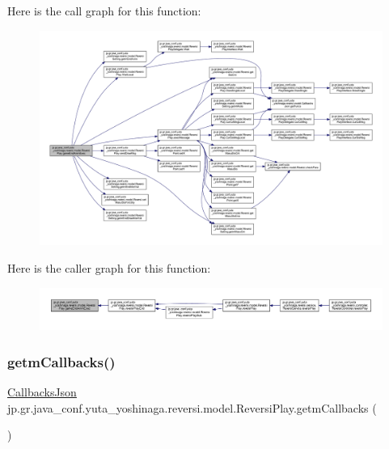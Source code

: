 Here is the call graph for this function\+:
\nopagebreak
\begin{figure}[H]
\begin{center}
\leavevmode
\includegraphics[width=350pt]{classjp_1_1gr_1_1java__conf_1_1yuta__yoshinaga_1_1reversi_1_1model_1_1_reversi_play_aaf0f07bdc219b6d8ec5551457fb551ab_cgraph}
\end{center}
\end{figure}
Here is the caller graph for this function\+:
\nopagebreak
\begin{figure}[H]
\begin{center}
\leavevmode
\includegraphics[width=350pt]{classjp_1_1gr_1_1java__conf_1_1yuta__yoshinaga_1_1reversi_1_1model_1_1_reversi_play_aaf0f07bdc219b6d8ec5551457fb551ab_icgraph}
\end{center}
\end{figure}
\mbox{\label{classjp_1_1gr_1_1java__conf_1_1yuta__yoshinaga_1_1reversi_1_1model_1_1_reversi_play_a0aa576ef708b45c21640e9c562c27ece}} 
\subsubsection{\texorpdfstring{getm\+Callbacks()}{getmCallbacks()}}
{\footnotesize\ttfamily \hyperlink{classjp_1_1gr_1_1java__conf_1_1yuta__yoshinaga_1_1reversi_1_1model_1_1_callbacks_json}{Callbacks\+Json} jp.\+gr.\+java\+\_\+conf.\+yuta\+\_\+yoshinaga.\+reversi.\+model.\+Reversi\+Play.\+getm\+Callbacks (\begin{DoxyParamCaption}{ }\end{DoxyParamCaption})}



